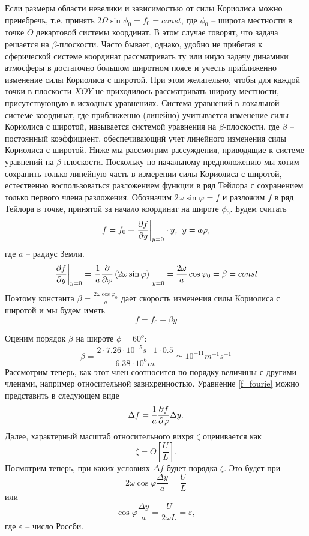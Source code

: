     Если размеры области невелики и зависимостью от силы Кориолиса можно пренебречь, т.е. принять $2\Omega \sin\phi_0=f_0=const$, где $\phi_0$ -- широта местности в точке $O$ декартовой системы координат. В этом случае говорят, что задача решается на $\beta$-плоскости.
    Часто бывает, однако, удобно не прибегая к сферической системе координат рассматривать ту или иную задачу динамики атмосферы в достаточно большом широтном поясе и учесть приближенно изменение силы Кориолиса с широтой. При этом желательно, чтобы для каждой точки в плоскости $XOY$ не приходилось рассматривать широту местности, присутствующую в исходных уравнениях. Система уравнений в локальной системе координат, где приближенно (линейно) учитывается изменение силы Кориолиса с широтой, называется системой уравнения на $\beta$-плоскости, где $\beta$ -- постоянный коэффициент, обеспечивающий учет линейного изменения силы Кориолиса с широтой. Ниже мы рассмотрим рассуждения, приводящие к системе уравнений на $\beta$-плоскости.
    Поскольку по начальному предположению мы хотим сохранить только линейную часть в измерении силы Кориолиса с широтой, естественно воспользоваться разложением функции в ряд Тейлора с сохранением только первого члена разложения. Обозначим $2\omega \sin\varphi =f$ и разложим $f$ в ряд Тейлора в точке, принятой за начало координат на широте $\phi_0$. Будем считать
    \begin{equation}
    \label{f_fourie}
        f = f_0 + \left. \displaystyle\frac{\partial f}{\partial y} \right|_{y=0} \cdot y, \:\: y=a\varphi,
    \end{equation} 
    где $a$ -- радиус Земли.
    \begin{equation}
        \left. \displaystyle\frac{\partial f}{\partial y} \right|_{y=0} = \left. \frac{1}{a}\frac{\partial}{\partial\varphi} \left( 2\omega \sin\varphi \right)\right|_{y=0} = \frac{2\omega}{a}\cos\varphi_0=\beta=const
    \end{equation}
    Поэтому константа $\beta=\frac{2\omega\cos\varphi_0}{a}$ дает скорость изменения силы Кориолиса с широтой и мы будем иметь  
    \begin{equation}
    \label{f_linear}
        f=f_0+\beta y    
    \end{equation}
    
    Оценим порядок $\beta$ на широте $\phi=60^o$: \\
    \[
        \beta=\frac{2 \cdot 7.26 \cdot 10^{-5}s{-1} \cdot 0.5}{6.38 \cdot 10^6 m} \simeq 10^{-11} m^{-1}s^{-1}
    \]
    Рассмотрим теперь, как этот член соотносится по порядку величины с другими членами, например относительной завихренностью. Уравнение \ref{f_fourie} можно представить в следующем виде
    \begin{equation}
        \Delta f = \frac{1}{a}\displaystyle\frac{\partial f}{\partial \varphi}\Delta y.
    \end{equation}
    Далее, характерный масштаб относительного вихря $\zeta$ оценивается как
    \[ 
        \zeta = O \left[ \frac{U}{L} \right].
    \]
   Посмотрим теперь, при каких условиях $\Delta f$ будет порядка $\zeta$. Это будет при 
   \[
   2\omega\cos\varphi\frac{\Delta y}{a}=\frac{U}{L}
   \] 
   или 
   \[\cos\varphi\frac{\Delta y}{a} = \frac{U}{2\omega L}=\varepsilon,\] 
   где $\varepsilon$ -- число Россби.

